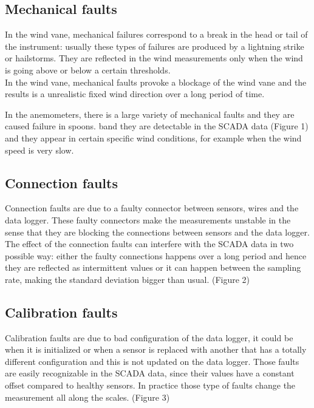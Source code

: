 \documentclass[journal]{IEEEtran}
\begin{document}
\subsection{Mechanical faults} 
\cite{morris1992comparison}
In the wind vane, mechanical failures correspond to a break in the head or tail of the instrument: usually these types of failures are produced by a lightning strike or hailstorms. They are reflected in the wind measurements only when the wind is going above or below a certain thresholds.\\
In the wind vane, mechanical faults provoke a blockage of the wind vane and the results is a unrealistic fixed wind direction over a long period of time.

In the anemometers, there is a large variety of mechanical faults and they are caused failure in  spoons. band they are detectable in the SCADA data (Figure 1) and they appear in certain specific wind conditions, for example when the wind speed is very slow. \\

\subsection{Connection  faults}
Connection faults are due to a faulty connector between sensors, wires and the data logger. These faulty connectors make the measurements unstable in the sense that they are blocking the connections between sensors and the data logger. The effect of the connection faults can interfere with the SCADA data in two possible way: either the faulty connections happens over a long period and hence they are reflected as intermittent values or it can happen between the sampling rate, making the standard deviation bigger than usual. (Figure 2) 
\subsection{Calibration faults} 
Calibration faults are due to bad configuration of the data logger, it could be when it is initialized or when a sensor is replaced with another that has a totally different configuration and this is not updated on the data logger. Those faults are easily recognizable in the SCADA data, since their values have a constant offset compared to healthy sensors. In practice those type of faults change the measurement all along the scales. (Figure 3)
\end{document}
